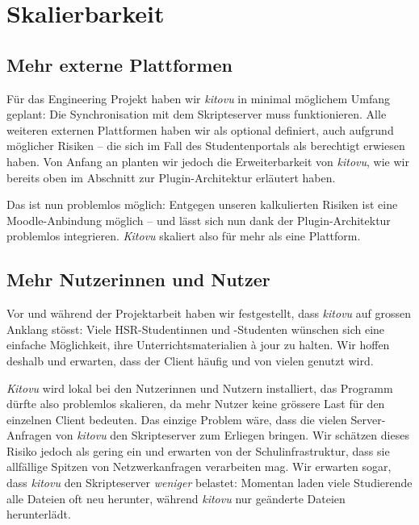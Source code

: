 \documentclass[a4paper]{article}
\let\oldsection\section
\renewcommand\section{\clearpage\oldsection}
\begin{document}
\section{Skalierbarkeit}

\subsection{Mehr externe Plattformen}

Für das Engineering Projekt haben wir \emph{kitovu} in minimal möglichem Umfang geplant: Die Synchronisation mit dem Skripteserver muss funktionieren. Alle weiteren externen Plattformen haben wir als optional definiert, auch aufgrund möglicher Risiken -- die sich im Fall des Studentenportals als berechtigt erwiesen haben. Von Anfang an planten wir jedoch die Erweiterbarkeit von \emph{kitovu}, wie wir bereits oben im Abschnitt zur Plugin-Architektur erläutert haben. 

Das ist nun problemlos möglich: Entgegen unseren kalkulierten Risiken ist eine Moodle-Anbindung möglich -- und lässt sich nun dank der Plugin-Architektur problemlos integrieren. \emph{Kitovu} skaliert also für mehr als eine Plattform.


\subsection{Mehr Nutzerinnen und Nutzer}

Vor und während der Projektarbeit haben wir festgestellt, dass \emph{kitovu} auf grossen Anklang stösst: Viele HSR-Studentinnen und -Studenten wünschen sich eine einfache Möglichkeit, ihre Unterrichtsmaterialien à jour zu halten. Wir hoffen deshalb und erwarten, dass der Client häufig und von vielen genutzt wird.

\emph{Kitovu} wird lokal bei den Nutzerinnen und Nutzern installiert, das Programm dürfte also problemlos skalieren, da mehr Nutzer keine grössere Last für den einzelnen Client bedeuten. Das einzige Problem wäre, dass die vielen Server-Anfragen von \emph{kitovu} den Skripteserver zum Erliegen bringen. Wir schätzen dieses Risiko jedoch als gering ein und erwarten von der Schulinfrastruktur, dass sie allfällige Spitzen von Netzwerkanfragen verarbeiten mag. Wir erwarten sogar, dass  \emph{kitovu} den Skripteserver \emph{weniger} belastet: Momentan laden viele Studierende alle Dateien oft neu herunter, während \emph{kitovu} nur geänderte Dateien herunterlädt.
\end{document}
